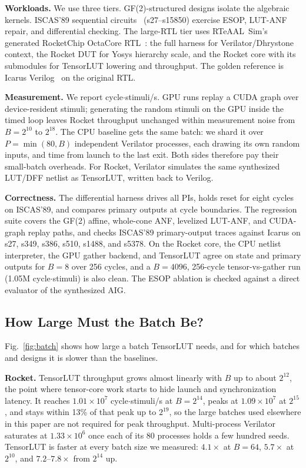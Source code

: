 \documentclass[sigconf]{acmart}
\begin{document}
\textbf{Workloads.} We use three tiers. GF(2)-structured designs isolate the algebraic kernels.
ISCAS'89 sequential circuits~\cite{iscas89} (s27--s15850) exercise ESOP, LUT-ANF repair, and
differential checking. The large-RTL tier uses RTeAAL~Sim's generated RocketChip OctaCore
RTL~\cite{rteaal}: the full harness for Verilator/Dhrystone context, the Rocket DUT for Yosys
hierarchy scale, and the Rocket core with its submodules for TensorLUT lowering and throughput. The
golden reference is Icarus Verilog~\cite{icarus} on the original RTL.

\textbf{Measurement.} We report cycle$\cdot$stimuli/s. GPU runs replay a CUDA graph over
device-resident stimuli; generating the random stimuli on the GPU inside the timed loop leaves
Rocket throughput unchanged within measurement noise from $B=2^{10}$ to $2^{18}$. The CPU baseline gets the same
batch: we shard it over $P=\min(80,B)$ independent Verilator processes, each drawing its own random
inputs, and time from launch to the last exit. Both sides therefore pay their small-batch overheads.
For Rocket, Verilator simulates the same synthesized LUT/DFF netlist as TensorLUT, written back to
Verilog.

\textbf{Correctness.} The differential harness drives all PIs, holds reset for eight cycles on
ISCAS'89, and compares primary outputs at cycle boundaries. The regression suite covers the GF(2)
affine, whole-cone ANF, levelized LUT-ANF, and CUDA-graph replay paths, and checks ISCAS'89
primary-output traces against Icarus on s27, s349, s386, s510, s1488, and s5378. On the Rocket core,
the CPU netlist interpreter, the GPU gather backend, and TensorLUT agree on state and primary outputs
for $B=8$ over 256 cycles, and a $B=4096$, 256-cycle tensor-vs-gather run (1.05M
cycle$\cdot$stimuli) is also clean. The ESOP ablation is checked against a direct evaluator of the
synthesized AIG.

\subsection{How Large Must the Batch Be?}
Fig.~\ref{fig:batch} shows how large a batch TensorLUT needs, and for which batches and designs
it is slower than the baselines.

\textbf{Rocket.} TensorLUT throughput grows almost linearly with $B$ up to about $2^{12}$, the point
where tensor-core work starts to hide launch and synchronization latency. It reaches
$1.01\times10^7$ cycle$\cdot$stimuli/s at $B=2^{14}$, peaks at $1.09\times10^7$ at $2^{15}$, and stays
within 13\% of that peak up to $2^{19}$, so the large batches used elsewhere in this paper are not
required for peak throughput. Multi-process Verilator saturates at $1.33\times10^6$ once each of its
80 processes holds a few hundred seeds. TensorLUT is faster at every batch size we measured:
$4.1\times$ at $B=64$, $5.7\times$ at $2^{10}$, and $7.2$--$7.8\times$ from $2^{14}$ up.
\end{document}
